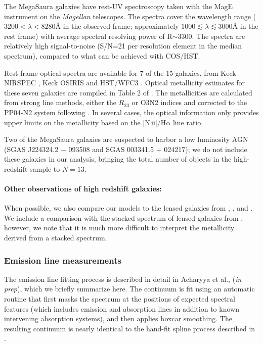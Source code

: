\documentclass[preprint2]{aastex62}
\newcommand{\nii}{[N\,{\sc ii}]\xspace}
\newcommand{\ha}{\ensuremath{\mathrm{H\alpha}}\xspace}
\newcommand{\ang}{\ensuremath{\mbox{\AA}}\xspace}
\newcommand{\mage}{{\sc Meg}a{\sc S}a{\sc ura}\xspace}
\begin{document}
The \mage galaxies have rest-UV spectroscopy taken with the MagE instrument on the \emph{Magellan} telescopes.
The spectra cover the wavelength range ($3200 < \lambda < 8280$\ang in the observed frame; approximately $1000 \lesssim \lambda \lesssim 3000$\ang in the rest frame) with average spectral resolving power of R$\sim3300$. The spectra are relatively high signal-to-noise (S/N=21 per resolution element in the median spectrum), compared to what can be achieved with COS/HST.

Rest-frame optical spectra are available for 7 of the 15 galaxies, from Keck NIRSPEC \citep{Rigby+2011}, Keck OSIRIS \citep{Wuyts+2014} and HST/WFC3 \citep{Whitaker+2014}. Optical metallicity estimates for these seven galaxies are compiled in Table 2 of \citet{Rigby+2018b}. The metallicities are calculated from strong line methods, either the $R_{23}$ or O3N2 indices \citep{Pettini+2004} and corrected to the PP04-N2 system following \citet{Kewley+2008}. In several cases, the optical information only provides upper limits on the metallicity based on the \nii/\ha line ratio.

Two of the \mage galaxies are suspected to harbor a low luminosity AGN (SGAS J224324.2 − 093508 and SGAS 003341.5 + 024217); we do not include these galaxies in our analysis, bringing the total number of objects in the high-redshift sample to $N=13$.

\paragraph{Other observations of high redshift galaxies:} When possible, we also compare our models to the lensed galaxies from \citet{Stark+2014}, \citet{Erb+2010}, and \citet{Christensen+2012}. We include a comparison with the stacked spectrum of lensed galaxies from \citet{Steidel+2016}, however, we note that it is much more difficult to interpret the metallicity derived from a stacked spectrum.

\subsubsection{Emission line measurements}

The emission line fitting process is described in detail in Acharyya et al., (\emph{in prep}), which we briefly summarize here. The continuum is fit using an automatic routine that first masks the spectrum at the positions of expected spectral features (which includes emission and absorption lines in addition to known intervening absorption systems), and then applies boxcar smoothing. The resulting continuum is nearly identical to the hand-fit spline process described in \citet{Rigby+2018a}. 
\end{document}
